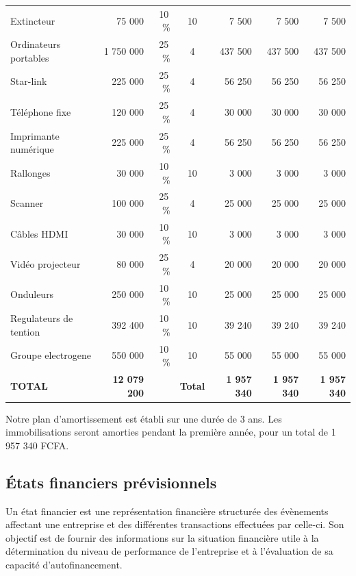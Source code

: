 \begin{xltabular}{\textwidth}{@{} X r r c r r r @{}}
Extincteur & 75 000 & 10\,\% & 10 & 7 500 & 7 500 & 7 500 \\
Ordinateurs portables & 1 750 000 & 25\,\% & 4 & 437 500 & 437 500 & 437 500 \\
Star-link & 225 000 & 25\,\% & 4 & 56 250 & 56 250 & 56 250 \\
Téléphone fixe & 120 000 & 25\,\% & 4 & 30 000 & 30 000 & 30 000 \\
Imprimante numérique & 225 000 & 25\,\% & 4 & 56 250 & 56 250 & 56 250 \\
Rallonges & 30 000 & 10\,\% & 10 & 3 000 & 3 000 & 3 000 \\
Scanner & 100 000 & 25\,\% & 4 & 25 000 & 25 000 & 25 000 \\
Câbles HDMI & 30 000 & 10\,\% & 10 & 3 000 & 3 000 & 3 000 \\
Vidéo projecteur & 80 000 & 25\,\% & 4 & 20 000 & 20 000 & 20 000 \\
Onduleurs & 250 000 & 10\,\% & 10 & 25 000 & 25 000 & 25 000 \\
Regulateurs de tention & 392 400 & 10\,\% & 10 & 39 240 & 39 240 & 39 240 \\
Groupe electrogene & 550 000 & 10\,\% & 10 & 55 000 & 55 000 & 55 000 \\
\midrule
\textbf{TOTAL} & \textbf{12 079 200} & & \textbf{Total} & \textbf{1 957 340} & \textbf{1 957 340} & \textbf{1 957 340} \\
\end{xltabular}

Notre plan d’amortissement est établi sur une durée de 3 ans. Les immobilisations seront amorties pendant la première année, pour un total de 1 957 340 FCFA. 

\subsection{États financiers prévisionnels}
Un état financier est une représentation financière structurée des évènements affectant une entreprise et des différentes transactions effectuées par celle-ci. Son objectif est de fournir des informations sur la situation financière utile à la détermination du niveau de performance de l’entreprise et à l’évaluation de sa capacité d’autofinancement.
